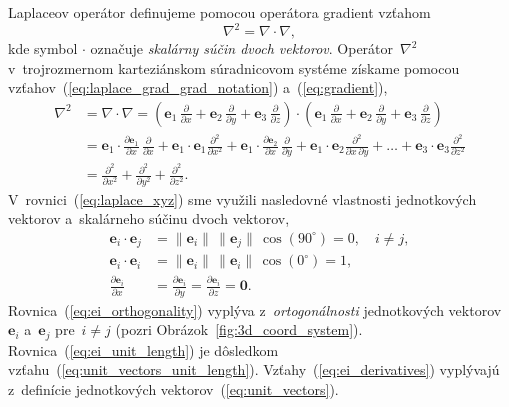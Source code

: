 \documentclass[a4paper,12pt]{book}
\let\vec\mathbf
\begin{document}
Laplaceov operátor definujeme pomocou operátora gradient vzťahom
\parencite{SansoGeoidDetermination}
%
\begin{equation}
\label{eq:laplace_grad_grad_notation}
\nabla^2 = \nabla \cdot \nabla{,}
\end{equation}
%
kde symbol $\cdot$ označuje \emph{skalárny súčin dvoch vektorov}.  
Operátor~$\nabla^2$ v~trojrozmernom karteziánskom súradnicovom systéme získame 
pomocou vzťahov~(\ref{eq:laplace_grad_grad_notation}) a~(\ref{eq:gradient}),
%
\begin{equation}
\label{eq:laplace_xyz}
\begin{split}
\nabla^2 &= \nabla \cdot \nabla = \left( \vec e_1 \, \frac{\partial}{\partial 
x} + \vec e_2 \, \frac{\partial}{\partial y} + \vec e_3 \, 
\frac{\partial}{\partial z} \right) \cdot \left( \vec e_1 \, 
\frac{\partial}{\partial x} + \vec e_2 \, \frac{\partial}{\partial y} + \vec 
e_3 \, \frac{\partial}{\partial z} \right)\\
%
&=\vec e_1 \cdot \frac{\partial \vec e_1}{\partial x} \, 
\frac{\partial}{\partial x} + \vec e_1 \cdot \vec e_1 
\frac{\partial^2}{\partial x^2} + \vec e_1 \cdot \frac{\partial \vec 
e_2}{\partial x} \, \frac{\partial}{\partial y} + \vec e_1 \cdot \vec e_2 
\frac{\partial^2}{\partial x \, \partial y} + \dots + \vec e_3 \cdot \vec e_3 
\frac{\partial^2}{\partial z^2}\\
%
&=\frac{\partial^2}{\partial x^2} + \frac{\partial^2}{\partial y^2} 
+ \frac{\partial^2}{\partial z^2}{.}
\end{split}
\end{equation}
%
V~rovnici~(\ref{eq:laplace_xyz}) sme využili nasledovné vlastnosti 
jednotkových vektorov a~skalárneho súčinu dvoch vektorov,
%
\begin{align}
\label{eq:ei_orthogonality}
\vec e_i \cdot \vec e_j &= \| \vec e_i \| \, \| \vec e_j \| \, \cos(90^\circ) 
= 0{,} \quad i \neq j{,}\\
%
\label{eq:ei_unit_length}
\vec e_i \cdot \vec e_i &= \| \vec e_i \| \, \| \vec e_i \| \, \cos(0^\circ) 
= 1{,}\\
%
\label{eq:ei_derivatives}
\frac{\partial \vec e_i}{\partial x} &= \frac{\partial \vec e_i}{\partial y} 
= \frac{\partial \vec e_i}{\partial z} = \vec 0{.}
\end{align}
%
Rovnica~(\ref{eq:ei_orthogonality}) vyplýva z~\emph{ortogonálnosti} 
jednotkových vektorov~$\vec e_i$ a~$\vec e_j$ pre~$i \neq j$ (pozri 
Obrázok~\ref{fig:3d_coord_system}).  Rovnica~(\ref{eq:ei_unit_length}) je 
dôsledkom vzťahu~(\ref{eq:unit_vectors_unit_length}).  
Vzťahy~(\ref{eq:ei_derivatives}) vyplývajú z~definície jednotkových 
vektorov~(\ref{eq:unit_vectors}).
\end{document}
